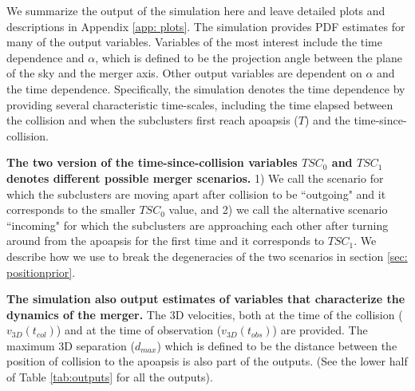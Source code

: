 We summarize the output of the simulation here and leave detailed
plots and descriptions in Appendix \ref{app: plots}. The simulation
provides PDF estimates for many of the output variables. Variables
of the most interest include the time dependence and $\alpha$, which is
defined to be the projection angle between the plane of the sky and the merger axis. Other output variables are dependent on $\alpha$ and the time
dependence. Specifically, the simulation denotes the time dependence by
providing several characteristic time-scales, including the time
elapsed between the collision and when the subclusters first reach apoapsis
($T$) and the time-since-collision.  

\textbf{The two version of the time-since-collision variables $TSC_0$ and
$TSC_1$ denotes different possible merger scenarios.} 1) We call the scenario for which the subclusters are
moving apart after collision to be ``outgoing" and it corresponds to the
smaller $TSC_0$ value, and 2) we call the alternative scenario 
``incoming" for which the subclusters are approaching each other after turning
around from the apoapsis for the first time and it corresponds to $TSC_1$.
We describe how we use to break the degeneracies of the two scenarios in
section \ref{sec: positionprior}. 
 
\textbf{The simulation also output estimates of variables that characterize
the dynamics of the merger.} The 3D velocities, both at the time of the
collision ($v_{3D}(t_{col})$) and at the time of observation
($v_{3D}(t_{obs})$) are provided. The maximum 3D separation ($d_{max}$)
which is defined to be the distance between the position of collision to the apoapsis is also part of
the outputs. (See the lower half of Table \ref{tab:outputs} for all the outputs).
%

